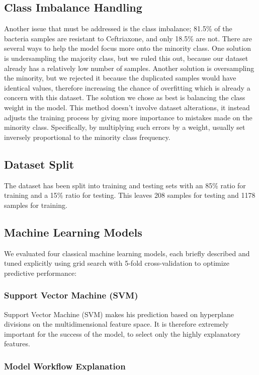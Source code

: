 \documentclass{article}
\begin{document}
\subsection{Class Imbalance Handling}
Another issue that must be addressed is the class imbalance; 81.5\% of the bacteria samples are resistant to Ceftriaxone, and only 18.5\% are not. There are several ways to help the model focus more onto the minority class. One solution is undersampling the majority class, but we ruled this out, because our dataset already has a relatively low number of samples. Another solution is oversampling the minority, but we rejected it because the duplicated samples would have identical values, therefore increasing the chance of overfitting which is already a concern with this dataset. The solution we chose as best is balancing the class weight in the model. This method doesn't involve dataset alterations, it instead adjusts the training process by giving more importance to mistakes made on the minority class. Specifically, by multiplying such errors by a weight, usually set inversely proportional to the minority class frequency.

\subsection{Dataset Split}

The dataset has been split into training and testing sets with an 85\% ratio for training and a 15\% ratio for testing. This leaves 208 samples for testing and 1178 samples for training.

\subsection{Machine Learning Models}

We evaluated four classical machine learning models, each briefly described and tuned explicitly using grid search with 5-fold cross-validation to optimize predictive performance:

\subsubsection{Support Vector Machine (SVM)}
Support Vector Machine (SVM) makes his prediction based on hyperplane divisions on the multidimensional feature space. It is therefore extremely important for the success of the model, to select only the highly explanatory features. 

\subsubsection{Model Workflow Explanation}
\end{document}

